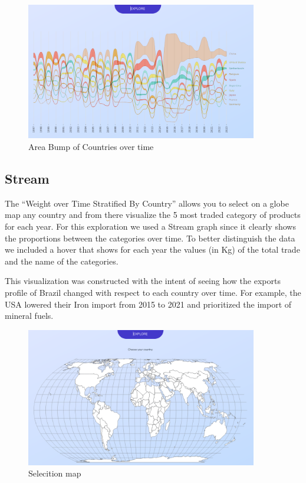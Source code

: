 \documentclass[12pt,a4]{article}
\begin{document}
\begin{figure}[H]
    \centering
    \includegraphics[width=0.9\textwidth]{assets/countries1.png}
    \caption{Area Bump of Countries over time}
\end{figure}

\subsection{Stream}
The “Weight over Time Stratified By Country” allows you to select on a globe map any country and from there visualize the 5 most traded category of products for each year. For this exploration we used a Stream graph since it clearly shows the proportions between the categories over time. To better distinguish the data we included a hover that shows for each year the values (in Kg) of the total trade and the name of the categories. 

This visualization was constructed with the intent of seeing how the exports profile of Brazil changed with respect to each country over time. For example, the USA lowered their Iron import from 2015 to 2021 and prioritized the import of mineral fuels.

\begin{figure}[H]
    \centering
    \includegraphics[width=0.9\textwidth]{assets/stream1.png}
    \caption{Selecition map}
\end{figure}
\end{document}
